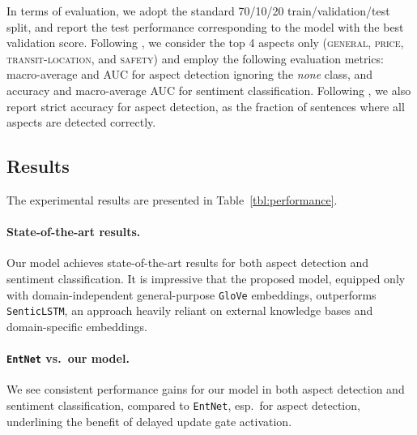 \documentclass[11pt,a4paper]{article}
\newcommand{\aspect}[1]{\textsc{#1}\xspace}
\newcommand{\system}[2][]{\texttt{#2#1}\xspace}
\newcommand{\tabref}[2][]{Table#1~\ref{#2}\xspace}
\newcommand{\ent}[1][]{\system[#1]{EntNet}}
\begin{document}
In terms of evaluation, we adopt the standard 70/10/20 train/validation/test split, and report the test performance corresponding to the model with the best validation score. Following , we 
consider the top 4 aspects only (\aspect{general}, \aspect{price}, \aspect{transit-location}, and \aspect{safety}) and 
employ the following evaluation metrics: macro-average  and AUC for aspect detection ignoring the \textit{none} class, and accuracy and macro-average AUC for sentiment classification. Following , we also report strict accuracy for aspect detection, as the fraction of sentences where all aspects are detected correctly.

\subsection{Results}

The experimental results are presented in \tabref{tbl:performance}.

\paragraph{State-of-the-art results.} Our model achieves state-of-the-art results for both aspect detection and sentiment classification. 
It is impressive that the proposed model, equipped only with domain-independent general-purpose \system{GloVe} embeddings, outperforms \system{SenticLSTM}, an approach heavily reliant on external knowledge bases and domain-specific embeddings.

\paragraph{\ent vs.\ our model.} We see consistent performance gains for our model in both aspect detection and sentiment classification, compared to \ent, esp.\ for aspect detection, underlining the benefit of delayed update gate activation.
\end{document}
